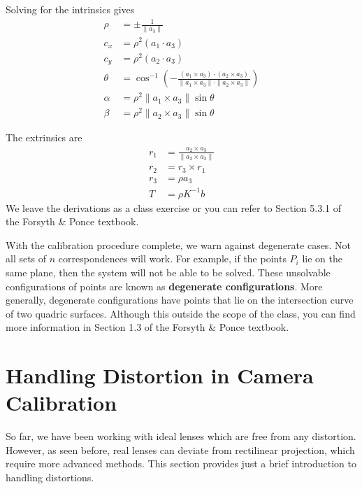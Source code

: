 \documentclass[a4paper, 12pt]{article}
\renewcommand\emph{\textbf}
\begin{document}
Solving for the intrinsics gives 
\begin{equation}\begin{aligned}
    \rho &= \pm \frac{1}{\|a_3\|}\\
    c_x &= \rho^2(a_1\cdot a_3)\\
    c_y &=\rho^2(a_2\cdot a_3)\\
    \theta &= \cos ^{-1} \left(-\frac{(a_1 \times a_3)\cdot(a_2\times a_3)}{\|a_1\times a_3\|\cdot\|a_2\times a_3\|}\right)\\
    \alpha &= \rho^2 \|a_1 \times a_3\| \sin \theta\\
    \beta &= \rho^2 \|a_2 \times a_3\| \sin \theta
\end{aligned}\end{equation}

The extrinsics are 
\begin{equation}\begin{aligned}
    r_1 &= \frac{a_2\times a_3}{\|a_2\times a_3\|}\\
    r_2 &= r_3\times r_1\\
    r_3 &= \rho a_3\\
    T &= \rho K^{-1} b
\end{aligned}\end{equation}
We leave the derivations as a class exercise or you can refer to Section 5.3.1 of the Forsyth \& Ponce textbook.

With the calibration procedure complete, we warn against degenerate cases. Not all sets of $n$ correspondences will work. For example, if the points $P_i$ lie on the same plane, then the system will not be able to be solved. These unsolvable configurations of points are known as \emph{degenerate configurations}. More generally, degenerate configurations have points that lie on the intersection curve of two quadric surfaces. Although this outside the scope of the class, you can find more information in Section 1.3 of the Forsyth \& Ponce textbook. 

\section{Handling Distortion in Camera Calibration}
So far, we have been working with ideal lenses which are free from any distortion. However, as seen before, real lenses can deviate from rectilinear projection, which require more advanced methods. This section provides just a brief introduction to handling distortions. 
\end{document}
